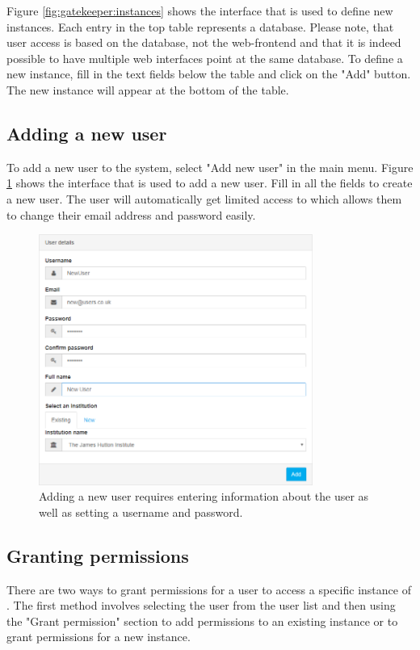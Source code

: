 Figure \ref{fig:gatekeeper:instances} shows the interface that is used to define new {\germinate} instances. Each entry in the top table represents a {\germinate} database. Please note, that user access is based on the database, not the web-frontend and that it is indeed possible to have multiple web interfaces point at the same database. To define a new instance, fill in the text fields below the table and click on the "Add" button. The new instance will appear at the bottom of the table.

\subsection{Adding a new user}
To add a new user to the system, select "Add new user" in the main menu. Figure \ref{fig:gatekeeper:new-user} shows the interface that is used to add a new user. Fill in all the fields to create a new user. The user will automatically get limited access to {\gatekeeper} which allows them to change their email address and password easily.

\begin{figure}
	\centering
	\includegraphics[width=0.8\textwidth]{img/gatekeeper/add-user.png}
	\caption{Adding a new user requires entering information about the user as well as setting a username and password.}
	\label{fig:gatekeeper:new-user}
\end{figure}

\subsection{Granting permissions}
\label{sec:gatekeeper:permissions}
There are two ways to grant permissions for a user to access a specific instance of {\germinate}. The first method involves selecting the user from the user list and then using the "Grant permission" section to add permissions to an existing {\germinate} instance or to grant permissions for a new instance.

